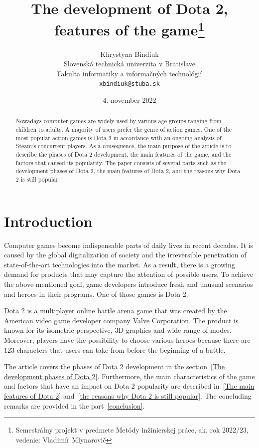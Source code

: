 \documentclass[12pt,twoside,english,a4paper]{article}
\title{The development of Dota 2, features of the game\thanks{Semestrálny projekt v predmete Metódy inžinierskej práce, ak. rok 2022/23, vedenie: Vladimír Mlynarovič}} %
\author{Khrystyna Bindiuk\\[2pt]
	{\small Slovenská technická univerzita v Bratislave}\\
	{\small Fakulta informatiky a informačných technológií}\\
	{\small \texttt{xbindiuk@stuba.sk}}
	}
\date{\small 4. november 2022} %
\begin{document}
\maketitle

\begin{abstract}

Nowadays computer games are widely used by various age groups ranging from children to adults. A majority of users prefer the genre of action games. One of the most popular action games is Dota 2 in accordance with an ongoing analysis of Steam's concurrent players. As a consequence, the main purpose of the article is to describe the phases of Dota 2 development, the main features of the game, and the factors that caused its popularity. The paper consists of several parts such as the development phases of Dota 2, the main features of Dota 2, and the reasons why Dota 2 is still popular.
\end{abstract}



\section*{Introduction}

Computer games become indispensable parts of daily lives in recent decades. It is caused by the global digitalization of society and the irreversible penetration of state-of-the-art technologies into the market. As a result, there is a growing demand for products that may capture the attention of possible users. To achieve the above-mentioned goal, game developers introduce fresh and unusual scenarios and heroes in their programs. One of those games is Dota 2. 

Dota 2 is a multiplayer online battle arena game that was created by the American video game developer company Valve Corporation. The product is known for its isometric perspective, 3D graphics and wide range of modes. Moreover, players have the possibility to choose various heroes because there are 123 characters that users can take from before the beginning of a battle.

The article covers the phases of Dota 2 development in the section~\ref{The development phases of Dota 2}. Furthermore, the main characteristics of the game and factors that have an impact on Dota 2 popularity are described in~\ref{The main features of Dota 2} and~\ref{the reasons why Dota 2 is still popular}. The concluding remarks are provided in the part~\ref{conclusion}.
\end{document}

